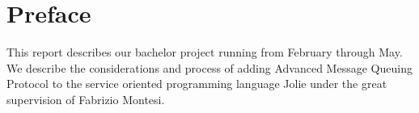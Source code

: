 \section{Preface}
This report describes our bachelor project running from February through May. We describe the considerations and process of adding Advanced Message Queuing Protocol to the service oriented programming language Jolie under the great supervision of Fabrizio Montesi.
\newpage
